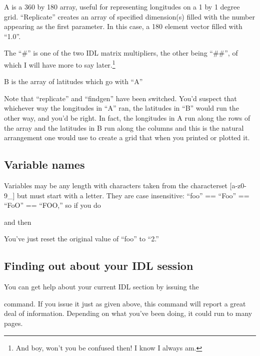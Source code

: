   

  A is a 360 by 180 array, useful for representing longitudes
  on a 1 by 1 degree grid. ``Replicate'' creates an array of
  specified dimension(s) filled with the number appearing as
  the first parameter. In this case, a 180 element vector
  filled with ``1.0''.

  The ``\#'' is one of the two IDL matrix multipliers, the other being
  ``\#\#'', of which I will have more to say later.\footnote{And boy,
  won't you be confused then! I know I always am.}


  B is the array of latitudes which go with ``A''

  Note that ``replicate'' and ``findgen'' have been switched. You'd
  suspect that whichever way the longitudes in ``A'' ran, the
  latitudes in ``B'' would run the other way, and you'd be right. In
  fact, the longitudes in A run along the rows of the array and the
  latitudes in B run along the columns and this is the natural
  arrangement one would use to create a grid that  when you printed or plotted it.
          
\subsection{Variable names}\label{sec:qs-Naming-Conventions}

  Variables may be any length with characters taken from the
  characterset [a-z0-9\_] but must start with a letter. They are case
  insensitive: ``foo'' == ``Foo'' == ``FoO'' == ``FOO,'' so if you do


  and then


  You've just reset the original value of ``foo'' to ``2.''


\subsection{Finding out about your IDL session}
\label{sec:qs-variables-help}

You can get help about your current IDL section by issuing the 


  command. If you issue it just as given above, this command will report
  a great deal of information. Depending on what you've been doing, it
  could run to many pages. 

